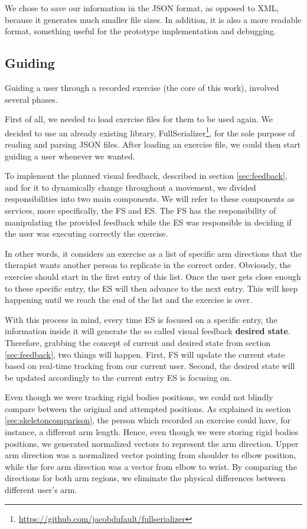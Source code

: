 We chose to save our information in the JSON format, as opposed to XML, because it generates much smaller file sizes. In addition, it is also a more readable format, something useful for the prototype implementation and debugging.

\subsection{Guiding}

Guiding a user through a recorded exercise (the core of this work), involved several phases.

First of all, we needed to load exercise files for them to be used again. 
We decided to use an already existing library, FullSerializer\footnote{\url{https://github.com/jacobdufault/fullserializer}}, for the sole purpose of reading and parsing JSON files.
After loading an exercise file, we could then start guiding a user whenever we wanted.

To implement the planned visual feedback, described in section \ref{sec:feedback}, and for it to dynamically change throughout a movement, 
we divided responsibilities into two main components. We will refer to these components as services, more specifically, the \ac{FS} and \ac{ES}.
The \ac{FS} has the responsibility of manipulating the provided feedback while the \ac{ES} was responsible in deciding if the user was executing correctly the exercise.

In other words, it considers an exercise as a list of specific arm directions that the therapist wants another person to replicate in the correct order. 
Obviously, the exercise should start in the first entry of this list. 
Once the user gets close enough to these specific entry, the \ac{ES} will then advance to the next entry. 
This will keep happening until we reach the end of the list and the exercise is over.

With this process in mind, every time \ac{ES} is focused on a specific entry, the information inside it will generate the so called visual feedback \textbf{desired state}. 
Therefore, grabbing the concept of current and desired state from section \ref{sec:feedback}, two things will happen. 
First, \ac{FS} will update the current state based on real-time tracking from our current user. 
Second, the desired state will be updated accordingly to the current entry \ac{ES} is focusing on.

Even though we were tracking rigid bodies positions, we could not blindly compare between the original and attempted positions.
As explained in section \ref{sec:skeletoncomparison}, the person which recorded an exercise could have, for instance, a different arm length. Hence, even though we were storing rigid bodies positions, we generated normalized vectors to represent the arm direction. 
Upper arm direction was a normalized vector pointing from shoulder to elbow position, while the fore arm direction was a vector from elbow to wrist.
By comparing the directions for both arm regions, we eliminate the physical differences between different user's arm.

